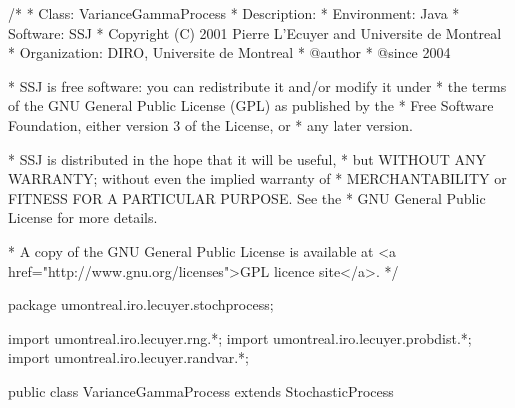 \begin{code}
\begin{hide}
/*
 * Class:        VarianceGammaProcess
 * Description:
 * Environment:  Java
 * Software:     SSJ
 * Copyright (C) 2001  Pierre L'Ecuyer and Universite de Montreal
 * Organization: DIRO, Universite de Montreal
 * @author
 * @since        2004

 * SSJ is free software: you can redistribute it and/or modify it under
 * the terms of the GNU General Public License (GPL) as published by the
 * Free Software Foundation, either version 3 of the License, or
 * any later version.

 * SSJ is distributed in the hope that it will be useful,
 * but WITHOUT ANY WARRANTY; without even the implied warranty of
 * MERCHANTABILITY or FITNESS FOR A PARTICULAR PURPOSE.  See the
 * GNU General Public License for more details.

 * A copy of the GNU General Public License is available at
   <a href="http://www.gnu.org/licenses">GPL licence site</a>.
 */
\end{hide}
package umontreal.iro.lecuyer.stochprocess;\begin{hide}
import umontreal.iro.lecuyer.rng.*;
import umontreal.iro.lecuyer.probdist.*;
import umontreal.iro.lecuyer.randvar.*;

\end{hide}

public class VarianceGammaProcess extends StochasticProcess \begin{hide} {

    protected GammaProcess   randomTime;  // For the transformed time method
    protected BrownianMotion BM;

    protected double       theta,
                           sigma,
                           nu;
\end{hide}
\end{code}
